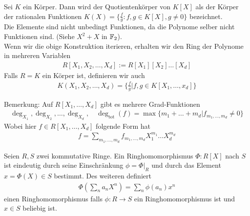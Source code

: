 \begin{proposition}[]
				Sei $K$ ein Körper. Dann wird der Quotientenkörper von $K[X]$ als der Körper der rationalen Funktionen $K(X) = \{ \frac{f}{g}: f,g \in K[X], g \neq 0\}$ bezeichnet.\\
Die Elemente sind nicht unbedingt Funktionen, da die Polynome selber nicht Funktionen sind. (Siehe $X^2 + X$ in $\mathbb{F}_2$).\\

Wenn wir die obige Konstruktion iterieren, erhalten wir den Ring der Polynome in mehreren Variablen
\begin{align*}
				R[X_1,X_2, \ldots , X_d] := R[X_1][X_2] \ldots [X_d]
\end{align*}
Falls $R = K$ ein Körper ist, definieren wir auch
\begin{align*}
				K(X_1, X_2, \ldots, X_d) = \{\frac{f}{g} \big\vert f,g \in K[X_1, \ldots, x_d]\}
\end{align*}
\end{proposition}

Bemerkung: Auf $R[X_1, \ldots, X_d]$ gibt es mehrere Grad-Funktionen
\begin{align*}
				\deg_{X_1}, \deg_{X_2}, \ldots, \deg_{X_d}, \quad  \deg_{\text{tot}}(f) = \max \{m_1 + \ldots + m_d \big\vert f_{m_1, \ldots, m_d} \neq 0\}
\end{align*}
Wobei hier $f \in R[X_1, \ldots, X_d]$ folgende Form hat
\begin{align*}
				f = \sum_{m_1, \ldots, m_d} f_{m_1, \ldots, m_d} X_1^{m_1} \dots X_d^{m_d}
\end{align*}


\begin{satz}[]
				Seien $R,S$ zwei kommutative Ringe. Ein Ringhomomorphismus $\Phi: R[X]$ nach $S$ ist eindeutig durch seine Einschränkung $\phi = \Phi|_R$ und durch das Element $x = \Phi(X) \in S$ bestimmt. Des weiteren definiert
\begin{align*}
				\Phi\left(\sum_n a_n X^n\right) = \sum_{n}\phi(a_n)x^n
\end{align*}
einen Ringhomomorphismus falls $\phi: R \to S$ ein Ringhomomorphismus ist und $x \in S$ beliebig ist.
\end{satz}


